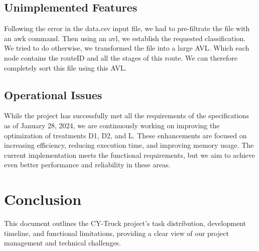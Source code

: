 \documentclass[11pt]{article}
\begin{document}
\subsection{Unimplemented Features}
Following the error in the data.csv input file, we had to pre-filtrate the file with an awk command. Then using an avl, we establish the requested classification.
We tried to do otherwise, we transformed the file into a large AVL. Which each node contains the routeID and all the stages of this route. We can therefore completely sort this file using this AVL.
\subsection{Operational Issues}
While the project has successfully met all the requirements of the specifications as of January 28, 2024, we are continuously working on improving the optimization of treatments D1, D2, and L. These enhancements are focused on increasing efficiency, reducing execution time, and improving memory usage. The current implementation meets the functional requirements, but we aim to achieve even better performance and reliability in these areas.



\section{Conclusion}
This document outlines the CY-Truck project's task distribution, development timeline, and functional limitations, providing a clear view of our project management and technical challenges.
\end{document}
